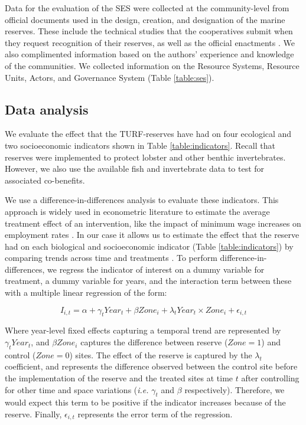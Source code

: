 \documentclass{frontiersSCNS}
\providecommand{\DIFaddtex}[1]{{\protect\color{blue}\uwave{#1}}} %
\providecommand{\DIFaddbegin}{} %
\providecommand{\DIFaddend}{} %
\providecommand{\DIFadd}[1]{\texorpdfstring{\DIFaddtex{#1}}{#1}} %
\begin{document}
Data for the evaluation of the SES were collected at the community-level from official documents used in the design, creation, and designation of the marine reserves. These include the technical studies that the cooperatives submit when they request recognition of their reserves, as well as the official enactments \citep{dof_website_2012,dof_website_2013,dof_website_2018}. We also complimented information based on the authors' experience and knowledge of the communities. We collected information on the Resource Systems, Resource Units, Actors, and Governance System (Table \ref{table:ses}).

\hypertarget{data-analysis}{%
\subsection{Data analysis}\label{data-analysis}}

We evaluate the effect that the TURF-reserves have had on four ecological and two socioeconomic indicators shown in Table \ref{table:indicators}. Recall that reserves were implemented to protect lobster and other benthic invertebrates. However, we also use the available fish and invertebrate data to test for associated co-benefits.

We use a difference-in-differences analysis to evaluate these indicators. This approach is widely used in econometric literature to estimate the average treatment effect of an intervention, like the impact of minimum wage increases on employment rates \citep{card_1994}. In our case it allows us to estimate the effect that the reserve had on each biological and socioeconomic indicator (Table \ref{table:indicators}) by comparing trends across time and treatments \DIFaddbegin \DIFadd{since reserve implementation }\DIFaddend \citep{moland_2013,Villasenor-Derbez_2018}. To perform difference-in-differences, we regress the indicator of interest on a dummy variable for treatment, a dummy variable for years, and the interaction term between these with a multiple linear regression of the form:

\begin{equation}
I_{i,t} = \alpha + \gamma_{t} Year_t + \beta Zone_i + \lambda_{t} Year_t\times Zone_i + \epsilon_{i,t}
\label{eqn:reg_bio}
\end{equation}

Where year-level fixed effects capturing a temporal trend are represented by \(\gamma_t Year_t\), and \(\beta Zone_i\) captures the difference between reserve (\(Zone = 1\)) and control (\(Zone = 0\)) sites. The effect of the reserve is captured by the \(\lambda_t\) coefficient, and represents the difference observed between the control site before the implementation of the reserve and the treated sites at time \(t\) after controlling for other time and space variations (\emph{i.e.} \(\gamma_t\) and \(\beta\) respectively). Therefore, we would expect this term to be positive if the indicator increases because of the reserve. Finally, \(\epsilon_{i,t}\) represents the error term of the regression.
\end{document}
